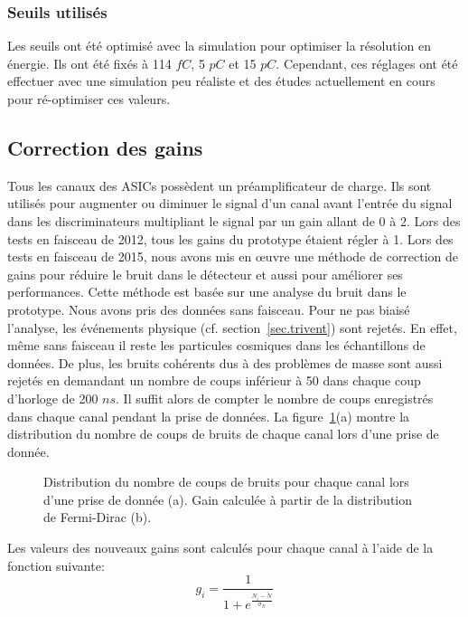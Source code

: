 \subsubsection{Seuils utilisés}
Les seuils ont été optimisé avec la simulation pour optimiser la résolution en énergie. Ils ont été fixés à 114 $fC$, 5 $pC$ et 15 $pC$. Cependant, ces réglages ont été effectuer avec une simulation peu réaliste et des études actuellement en cours pour ré-optimiser ces valeurs.

\subsection{Correction des gains}
\label{sec.gainCorrect}
Tous les canaux des ASICs possèdent un préamplificateur de charge. Ils sont utilisés pour augmenter ou diminuer le signal d'un canal avant l'entrée du signal dans les discriminateurs multipliant le signal par un gain allant de 0 à 2. Lors des tests en faisceau de 2012, tous les gains du prototype étaient régler à 1. Lors des tests en faisceau de 2015, nous avons mis en œuvre une méthode de correction de gains pour réduire le bruit dans le détecteur et aussi pour améliorer ses performances. Cette méthode est basée sur une analyse du bruit dans le prototype. Nous avons pris des données sans faisceau. Pour ne pas biaisé l'analyse, les événements physique (cf. section~\ref{sec.trivent}) sont rejetés. En effet, même sans faisceau il reste les particules cosmiques dans les échantillons de données. De plus, les bruits cohérents dus à des problèmes de masse sont aussi rejetés en demandant un nombre de coups inférieur à 50 dans chaque coup d'horloge de 200 $ns$. Il suffit alors de compter le nombre de coups enregistrés dans chaque canal pendant la prise de données. La figure~\ref{fig:noise_and_gain}(a) montre la distribution du nombre de coups de bruits de chaque canal lors d'une prise de donnée.
\begin{figure}[!ht]
  \caption{Distribution du nombre de coups de bruits pour chaque canal lors d'une prise de donnée (a). Gain calculée à partir de la distribution de Fermi-Dirac (b).\label{fig:noise_and_gain}}
\end{figure}
Les valeurs des nouveaux gains sont calculés pour chaque canal à l'aide de la fonction suivante:
\begin{equation}
  g_i=\frac{1}{1+e^{\frac{N_i-\tilde{N}}{\sigma_N}}}
\end{equation}
